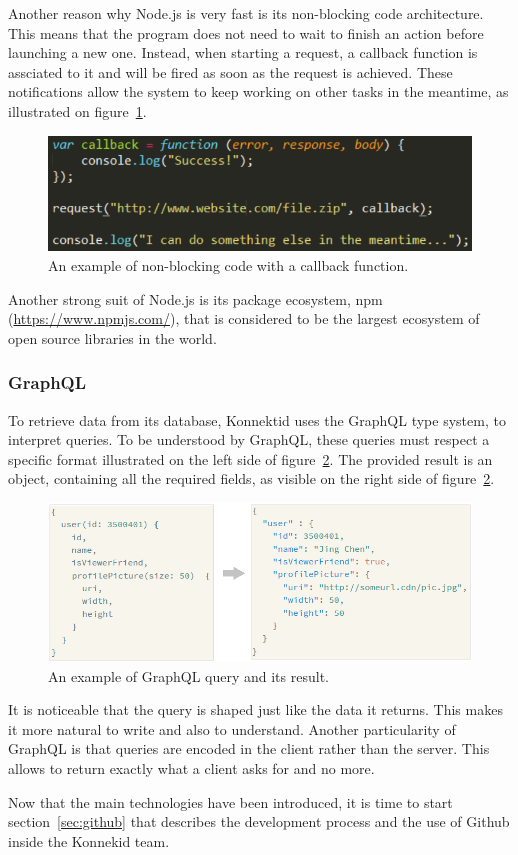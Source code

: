 Another reason why Node.js is very fast is its non-blocking code architecture. This means that the program does not need to wait to finish an action before launching
a new one. Instead, when starting a request, a callback function is assciated to it and will be fired as soon as the request is achieved. These notifications allow
the system to keep working on other tasks in the meantime, as illustrated on {\sc figure}~\ref{fig:callback}.

\begin{figure}[H]
    \centering
    \includegraphics[scale=0.8]{figure/callback.png}
    \caption{An example of non-blocking code with a callback function.}
    \label{fig:callback}
\end{figure}

Another strong suit of Node.js is its package ecosystem, npm (\url{https://www.npmjs.com/}), that is considered to be the largest ecosystem of open source libraries
in the world.

\subsubsection{GraphQL}
\label{sssec:grqphql}

To retrieve data from its database, Konnektid uses the GraphQL type system, to interpret queries. To be understood by GraphQL, these queries must respect a specific
format illustrated on the left side of {\sc figure}~\ref{fig:query}. The provided result is an object, containing all the required fields, as visible on the right side
of {\sc figure}~\ref{fig:query}.

\begin{figure}[H]
    \centering
    \includegraphics[scale=0.8]{figure/query.png}
    \caption{An example of GraphQL query and its result.}
    \label{fig:query}
\end{figure}

It is noticeable that the query is shaped just like the data it returns. This makes it more natural to write and also to understand.
Another particularity of GraphQL is that queries are encoded in the client rather than the server. This allows to return exactly what a client asks for and no more.

Now that the main technologies have been introduced, it is time to start {\sc section}~\ref{sec:github} that describes the development process and the use
of Github inside the Konnekid team.
